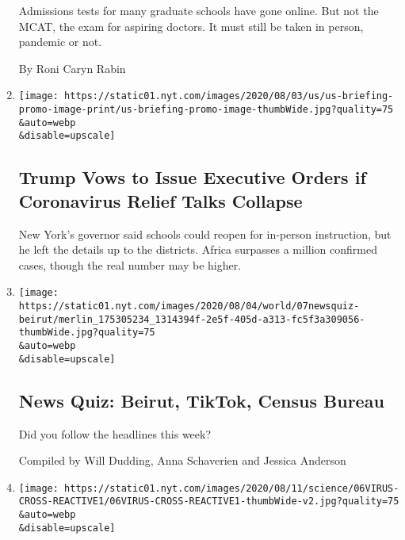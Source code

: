\begin{enumerate}
  Admissions tests for many graduate schools have gone online. But not
  the MCAT, the exam for aspiring doctors. It must still be taken in
  person, pandemic or not.

  By Roni Caryn Rabin
\item
  \href{/2020/08/07/world/covid-19-news.html}{}

  \texttt{[image: https://static01.nyt.com/images/2020/08/03/us/us-briefing-promo-image-print/us-briefing-promo-image-thumbWide.jpg?quality=75\\\&auto=webp\\\&disable=upscale]}

  \hypertarget{trump-vows-to-issue-executive-orders-if-coronavirus-relief-talks-collapse}{%
  \subsection{Trump Vows to Issue Executive Orders if Coronavirus Relief
  Talks
  Collapse}\label{trump-vows-to-issue-executive-orders-if-coronavirus-relief-talks-collapse}}

  New York's governor said schools could reopen for in-person
  instruction, but he left the details up to the districts. Africa
  surpasses a million confirmed cases, though the real number may be
  higher.
\item
  \href{/interactive/2020/08/07/briefing/beirut-tiktok-census-bureau-news-quiz.html}{}

  \texttt{[image: https://static01.nyt.com/images/2020/08/04/world/07newsquiz-beirut/merlin\_175305234\_1314394f-2e5f-405d-a313-fc5f3a309056-thumbWide.jpg?quality=75\\\&auto=webp\\\&disable=upscale]}

  \hypertarget{news-quiz-beirut-tiktok-census-bureau}{%
  \subsection{News Quiz: Beirut, TikTok, Census
  Bureau}\label{news-quiz-beirut-tiktok-census-bureau}}

  Did you follow the headlines this week?

  Compiled by Will Dudding, Anna Schaverien and Jessica Anderson
\item
  \href{/2020/08/06/health/coronavirus-immune-cells.html}{}

  \texttt{[image: https://static01.nyt.com/images/2020/08/11/science/06VIRUS-CROSS-REACTIVE1/06VIRUS-CROSS-REACTIVE1-thumbWide-v2.jpg?quality=75\\\&auto=webp\\\&disable=upscale]}

  \hypertarget{the-coronavirus-is-new-but-your-immune-system-might-still-recognize-it}{%
}
\end{enumerate}
